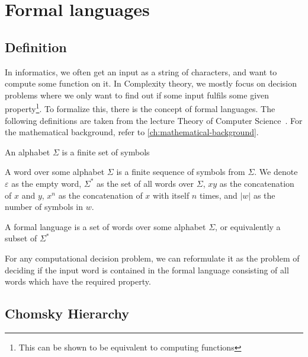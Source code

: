 \chapter{Formal languages}\label{ch:formal-languages}


\section{Definition}\label{sec:definition}

In informatics, we often get an input as a string of characters, and want to compute some function on it.
In Complexity theory, we mostly focus on decision problems where we only want to find out if some input fulfils some given property\footnote{This can be shown to be equivalent to computing functions}.
To formalize this, there is the concept of formal languages.
The following definitions are taken from the lecture Theory of Computer Science~\cite{theory-cs}.
For the mathematical background, refer to \autoref{ch:mathematical-background}.

\begin{define}[Alphabet]
    An alphabet $\Sigma$ is a finite set of symbols
\end{define}

\begin{define}[Word]
    A word over some alphabet $\Sigma$ is a finite sequence of symbols from $\Sigma$.
    We denote $\varepsilon$ as the empty word, $\Sigma^*$ as the set of all words over $\Sigma$, $xy$ as the concatenation of $x$ and $y$, $x^{n}$ as the concatenation of $x$ with itself $n$ times, and $|w|$ as the number of symbols in $w$.
\end{define}

\begin{define}
    A formal language is a set of words over some alphabet $\Sigma$, or equivalently a subset of $\Sigma^*$
\end{define}

For any computational decision problem, we can reformulate it as the problem of deciding if the input word is contained in the formal language consisting of all words which have the required property.


\section{Chomsky Hierarchy}\label{sec:chromsky-hierarchy}

